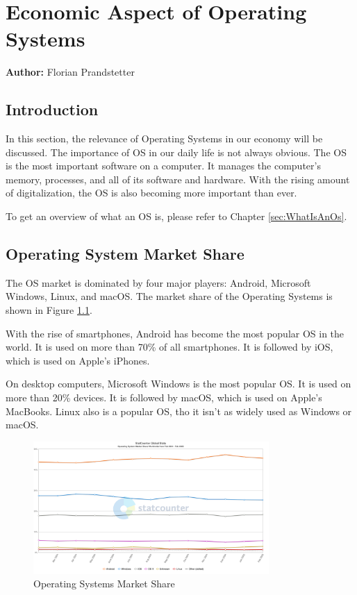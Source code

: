 \chapter{Economic Aspect of Operating Systems}
\label{chap:Economic_aspect_of_Operating_Systems}
\textbf{Author:} Florian Prandstetter

\section{Introduction}

In this section, the relevance of Operating Systems in our economy will be discussed. The importance of OS in our daily life is not always obvious.
The OS is the most important software on a computer. It manages the computer's memory, processes, and all of its software and hardware. 
With the rising amount of digitalization, the OS is also becoming more important than ever.

To get an overview of what an OS is, please refer to Chapter \ref{sec:WhatIsAnOs}.

\section{Operating System Market Share}

The OS market is dominated by four major players: Android, Microsoft Windows, Linux, and macOS.
The market share of the Operating Systems is shown in Figure \ref{fig:Operating_Systems_Market_Share}. 

With the rise of smartphones, Android has become the most popular OS in the world. It is used on more than 70\% of all smartphones. It is followed by iOS, which is used on Apple's iPhones.

On desktop computers, Microsoft Windows is the most popular OS. It is used on more than 20\% devices. It is followed by macOS, which is used on Apple's MacBooks. Linux also is a popular OS, tho it isn't as widely used as Windows or macOS.

\begin{figure}[H]
    \centering
    \includegraphics[width=0.8\textwidth]{figures/StatCounter-os_combined-ww-monthly-202402-202502.png}
    \caption{Operating Systems Market Share}
    \label{fig:Operating_Systems_Market_Share}
\end{figure}
\cite{OsMarketShare2}


